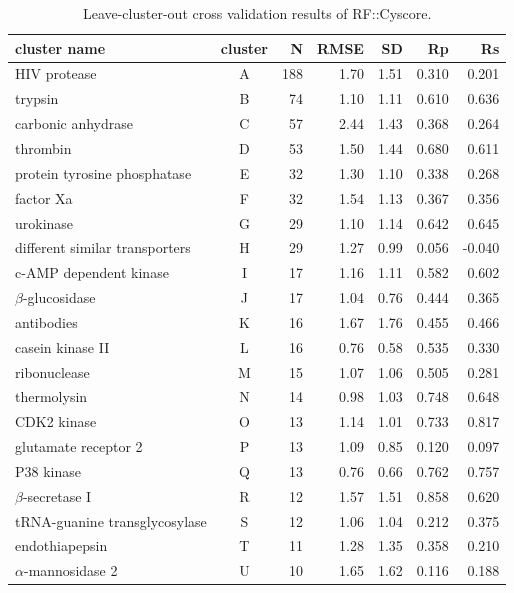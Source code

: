 \begin{table}
\caption{Leave-cluster-out cross validation results of RF::Cyscore.}
\label{rfcyscore:lcocv2}
\begin{tabular}{lcrrrrr}
\hline
cluster name & cluster & N & RMSE & SD & Rp & Rs\\
\hline
HIV protease                   & A & 188 & 1.70 & 1.51 & 0.310 & 0.201\\
trypsin                        & B &  74 & 1.10 & 1.11 & 0.610 & 0.636\\
carbonic anhydrase             & C &  57 & 2.44 & 1.43 & 0.368 & 0.264\\
thrombin                       & D &  53 & 1.50 & 1.44 & 0.680 & 0.611\\
protein tyrosine phosphatase   & E &  32 & 1.30 & 1.10 & 0.338 & 0.268\\
factor Xa                      & F &  32 & 1.54 & 1.13 & 0.367 & 0.356\\
urokinase                      & G &  29 & 1.10 & 1.14 & 0.642 & 0.645\\
different similar transporters & H &  29 & 1.27 & 0.99 & 0.056 &-0.040\\
c-AMP dependent kinase         & I &  17 & 1.16 & 1.11 & 0.582 & 0.602\\
$\beta$-glucosidase            & J &  17 & 1.04 & 0.76 & 0.444 & 0.365\\
antibodies                     & K &  16 & 1.67 & 1.76 & 0.455 & 0.466\\
casein kinase II               & L &  16 & 0.76 & 0.58 & 0.535 & 0.330\\
ribonuclease                   & M &  15 & 1.07 & 1.06 & 0.505 & 0.281\\
thermolysin                    & N &  14 & 0.98 & 1.03 & 0.748 & 0.648\\
CDK2 kinase                    & O &  13 & 1.14 & 1.01 & 0.733 & 0.817\\
glutamate receptor 2           & P &  13 & 1.09 & 0.85 & 0.120 & 0.097\\
P38 kinase                     & Q &  13 & 0.76 & 0.66 & 0.762 & 0.757\\
$\beta$-secretase I            & R &  12 & 1.57 & 1.51 & 0.858 & 0.620\\
tRNA-guanine transglycosylase  & S &  12 & 1.06 & 1.04 & 0.212 & 0.375\\
endothiapepsin                 & T &  11 & 1.28 & 1.35 & 0.358 & 0.210\\
$\alpha$-mannosidase 2         & U &  10 & 1.65 & 1.62 & 0.116 & 0.188\\

\end{tabular}
\end{table}
